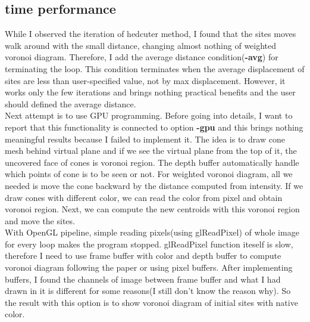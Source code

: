 \documentclass[11pt]{article}
\begin{document}
\subsection{time performance}
While I observed the iteration of hedcuter method, I found that the sites moves walk around with the small distance, changing almost nothing of weighted voronoi diagram. Therefore, I add the average distance condition(\textbf{-avg}) for terminating the loop. This condition terminates when the average displacement of sites are less than user-specified value, not by max displacement. However, it works only the few iterations and brings nothing practical benefits and the user should defined the average distance.\\
Next attempt is to use GPU programming\cite{Hoff:1999:FCG:311535.311567}. Before going into details, I want to report that this functionality is connected to option \textbf{-gpu} and this brings nothing meaningful results because I failed to implement it. The idea is to draw cone mesh behind virtual plane and if we see the virtual plane from the top of it, the uncovered face of cones is voronoi region. The depth buffer automatically handle which points of cone is to be seen or not. For weighted voronoi diagram, all we needed is move the cone backward by the distance computed from intensity. If we draw cones with different color, we can read the color from pixel and obtain voronoi region. Next, we can compute the new centroids with this voronoi region and move the sites.\\
With OpenGL pipeline, simple reading pixels(using glReadPixel) of whole image for every loop makes the program stopped. glReadPixel function iteself is slow, therefore I need to use frame buffer with color and depth buffer to compute voronoi diagram following the paper\cite{Hoff:1999:FCG:311535.311567} or using pixel buffers. After implementing buffers, I found the channels of image between frame buffer and what I had drawn in it is different for some reasons(I still don't know the reason why). So the result with this option is to show voronoi diagram of initial sites with native color.  
\end{document}
